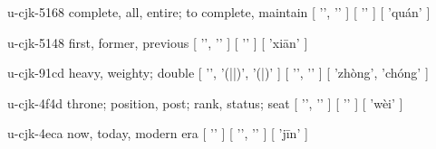 \begin{multicols}{2}
\cjkgGlue{} u-cjk-5168  complete, all, entire; to complete, maintain  [ '\cjkgGlue{}', '\cjkgGlue{}' ]  [ '\cjkgGlue{}' ]  [ 'quán' ] 

\cjkgGlue{} u-cjk-5148  first, former, previous  [ '\cjkgGlue{}', '\cjkgGlue{}' ]  [ '\cjkgGlue{}' ]  [ 'xi{\mktsRsgFb{}ā}n' ] 

\cjkgGlue{} u-cjk-91cd  heavy, weighty; double  [ '\cjkgGlue{}', '\cjkgGlue{}(\cjkgGlue{}|\cjkgGlue{}|\cjkgGlue{})', '\cjkgGlue{}(\cjkgGlue{}|\cjkgGlue{})' ]  [ '\cjkgGlue{}', '\cjkgGlue{}' ]  [ 'zhòng', 'chóng' ] 

\cjkgGlue{} u-cjk-4f4d  throne; position, post; rank, status; seat  [ '\cjkgGlue{}', '\cjkgGlue{}' ]  [ '\cjkgGlue{}' ]  [ 'wèi' ] 

\cjkgGlue{} u-cjk-4eca  now, today, modern era  [ '\cjkgGlue{}' ]  [ '\cjkgGlue{}', '\cjkgGlue{}' ]  [ 'j{\mktsRsgFb{}ī}n' ] 


\end{multicols}
